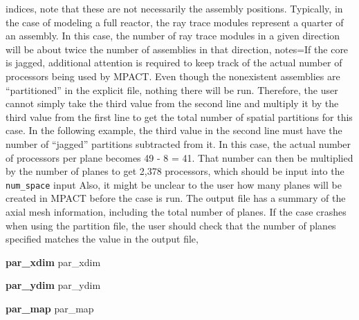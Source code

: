 {{        indices, note that these are not necessarily the assembly
        positions. Typically, in the case of modeling a full reactor, the ray trace
        modules represent a quarter of an assembly. In this case,
        the number of ray trace modules in a given direction will be about twice the
        number of assemblies in that direction},
     notes={If the core is jagged, additional attention is required to keep
        track of the actual number of processors being used by MPACT.
        Even though the nonexistent assemblies are ``partitioned'' in the
        explicit file, nothing there will be run. Therefore, the user cannot simply
        take the third value from the second line and multiply it by the third
        value from the first line to get the total number of spatial partitions
        for this case. In the following example, the third value in the second
        line must have the number of ``jagged'' partitions subtracted from it.
        In this case, the actual number of processors per plane becomes
        49 - 8 = 41. That number can then be multiplied by the number of
        planes to get 2,378 processors, which should be input into the
        \texttt{num\_space} input \newline
        Also, it might be unclear to the user how many planes will be created
        in MPACT before the case is run. The output file has a summary of
        the axial mesh information, including the total number of planes.
        If the case crashes when using the partition file, the user should check that the
        number of planes specified matches the value in the output file},
   }

   {\bf par\_xdim} par\_xdim

   {\bf par\_ydim} par\_ydim

   {\bf par\_map} par\_map

